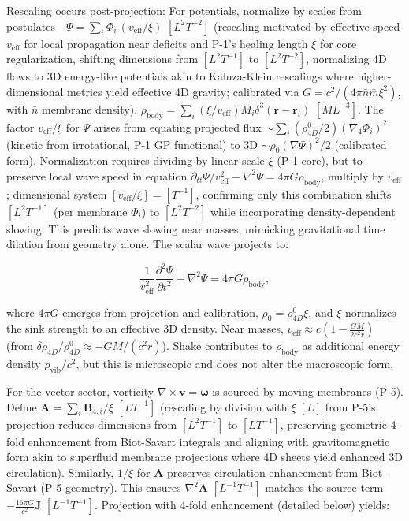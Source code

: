 Rescaling occurs post-projection: For potentials, normalize by scales from postulates---$\Psi = \sum_i \Phi_i \, (v_{\text{eff}} / \xi)$ $[L^2 T^{-2}]$ (rescaling motivated by effective speed $v_{\text{eff}}$ for local propagation near deficits and P-1's healing length $\xi$ for core regularization, shifting dimensions from $[L^2 T^{-1}]$ to $[L^2 T^{-2}]$, normalizing 4D flows to 3D energy-like potentials akin to Kaluza-Klein rescalings where higher-dimensional metrics yield effective 4D gravity; calibrated via $G = c^2 / (4\pi \bar{n} \bar{m} \xi^2)$, with $\bar{n}$ membrane density), $\rho_{\text{body}} = \sum_i \left( \xi / v_{\text{eff}} \right) \dot{M}_i \delta^3(\mathbf{r} - \mathbf{r}_i)$ $[M L^{-3}]$. The factor $v_{\text{eff}} / \xi$ for $\Psi$ arises from equating projected flux $\sim \sum_i (\rho_{4D}^0 / 2) (\nabla_4 \Phi_i)^2$ (kinetic from irrotational, P-1 GP functional) to 3D $\sim \rho_0 (\nabla \Psi)^2 / 2$ (calibrated form). Normalization requires dividing by linear scale $\xi$ (P-1 core), but to preserve local wave speed in equation $\partial_{tt} \Psi / v_{\text{eff}}^2 - \nabla^2 \Psi = 4\pi G \rho_{\text{body}}$, multiply by $v_{\text{eff}}$; dimensional system $[v_{\text{eff}} / \xi] = [T^{-1}]$, confirming only this combination shifts $[L^2 T^{-1}]$ (per membrane $\Phi_i$) to $[L^2 T^{-2}]$ while incorporating density-dependent slowing. This predicts wave slowing near masses, mimicking gravitational time dilation from geometry alone. The scalar wave projects to:

\begin{equation}
\frac{1}{v_{\text{eff}}^2} \frac{\partial^2 \Psi}{\partial t^2} - \nabla^2 \Psi = 4\pi G \rho_{\text{body}},
\end{equation}

where $4\pi G$ emerges from projection and calibration, $\rho_0 = \rho_{4D}^0 \xi$, and $\xi$ normalizes the sink strength to an effective 3D density. Near masses, $v_{\text{eff}} \approx c \left(1 - \frac{G M}{2 c^2 r}\right)$ (from $\delta \rho_{4D} / \rho_{4D}^0 \approx - G M / (c^2 r)$). Shake contributes to $\rho_{\text{body}}$ as additional energy density $\rho_{\text{vib}} / c^2$, but this is microscopic and does not alter the macroscopic form.

For the vector sector, vorticity $\nabla \times \mathbf{v} = \boldsymbol{\omega}$ is sourced by moving membranes (P-5). Define $\mathbf{A} = \sum_i \mathbf{B}_{4,i} / \xi$ $[L T^{-1}]$ (rescaling by division with $\xi$ $[L]$ from P-5's projection reduces dimensions from $[L^2 T^{-1}]$ to $[L T^{-1}]$, preserving geometric 4-fold enhancement from Biot-Savart integrals and aligning with gravitomagnetic form akin to superfluid membrane projections where 4D sheets yield enhanced 3D circulation). Similarly, $1/\xi$ for $\mathbf{A}$ preserves circulation enhancement from Biot-Savart (P-5 geometry). This ensures $\nabla^2 \mathbf{A}$ $[L^{-1} T^{-1}]$ matches the source term $-\frac{16\pi G}{c^2} \mathbf{J}$ $[L^{-1} T^{-1}]$. Projection with 4-fold enhancement (detailed below) yields:

